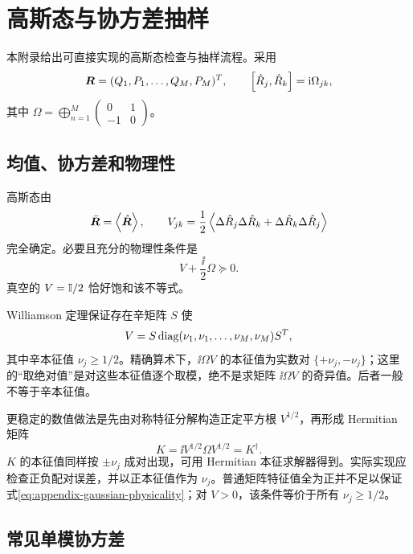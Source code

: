 \chapter{高斯态与协方差抽样}
\label{app:gaussian}

本附录给出可直接实现的高斯态检查与抽样流程。采用
\begin{equation}
  \bm R=(Q_1,P_1,\ldots,Q_M,P_M)^T,
  \qquad
  \left[\hat R_j,\hat R_k\right]=\mathrm{i}\Omega_{jk},
\end{equation}
其中
$\Omega=\bigoplus_{n=1}^M\begin{pmatrix}0&1\\-1&0\end{pmatrix}$。

\section{均值、协方差和物理性}

高斯态由
\begin{equation}
  \bar{\bm R}=\left\langle \hat{\bm R}\right\rangle,
  \qquad
  V_{jk}=\frac12\left\langle 
  \Delta\hat R_j\Delta\hat R_k+
  \Delta\hat R_k\Delta\hat R_j\right\rangle
\end{equation}
完全确定。必要且充分的物理性条件是
\begin{equation}
  V+\frac{\ii}{2}\Omega\succeq0.
  \label{eq:appendix-gaussian-physicality}
\end{equation}
真空的 $V=\mathbb{I}/2$ 恰好饱和该不等式。

Williamson 定理保证存在辛矩阵 $S$ 使
\begin{equation}
  V=S\operatorname{diag}(\nu_1,\nu_1,\ldots,\nu_M,\nu_M)S^T,
\end{equation}
其中辛本征值 $\nu_j\ge1/2$。精确算术下，$\ii\Omega V$ 的本征值为实数对 $\{+\nu_j,-\nu_j\}$；这里的“取绝对值”是对这些本征值逐个取模，绝不是求矩阵 $\ii\Omega V$ 的奇异值。后者一般不等于辛本征值。

更稳定的数值做法是先由对称特征分解构造正定平方根 $V^{1/2}$，再形成 Hermitian 矩阵
\begin{equation}
  K=\ii V^{1/2}\Omega V^{1/2}=K^\dagger.
  \label{eq:hermitian-symplectic-spectrum}
\end{equation}
$K$ 的本征值同样按 $\pm\nu_j$ 成对出现，可用 Hermitian 本征求解器得到。实际实现应检查正负配对误差，并以正本征值作为 $\nu_j$。普通矩阵特征值全为正并不足以保证式\eqref{eq:appendix-gaussian-physicality}；对 $V>0$，该条件等价于所有 $\nu_j\ge1/2$。

\section{常见单模协方差}

